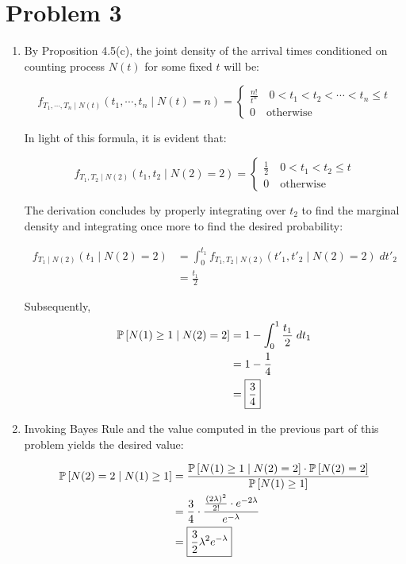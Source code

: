 \documentclass[12pt]{article}%
\begin{document}
\section{Problem 3}
\begin{enumerate}
  \item By Proposition 4.5(c), the joint density of the arrival times conditioned on counting process $N(t)$ for some fixed $t$ will be:

\[ f_{T_1,\cdots,T_n\mid N(t)}(t_1,\cdots,t_n\mid N(t) = n) = \begin{cases}
    \frac{n!}{t^{n}} \quad 0 < t_1 < t_2 < \cdots < t_n \leq t \\
    0 \quad \text{otherwise}
\end{cases} \]

  In light of this formula, it is evident that:

  \[ f_{T_1,T_2\mid N(2)}(t_1,t_2 \mid N(2) = 2) = \begin{cases}
      \frac{1}{2} \quad 0 < t_1 < t_2  \leq t \\
      0 \quad \text{otherwise}
  \end{cases} \]

  The derivation concludes by properly integrating over $t_2$ to find the marginal density and integrating once more to find the desired probability:

  \begin{align*}
     f_{T_1\mid N(2)}(t_1\mid N(2)=2) & = \int_0^{t_1} f_{T_1,T_2\mid N(2)}(t'_1,t'_2 \mid N(2) = 2) \; dt'_2 \\
    & = \frac{t_1}{2}
    \end{align*}

  Subsequently,
  \begin{align*}
    \mathbb{P}\left[N(1) \geq 1 \mid N(2) = 2\right] &  = 1 - \int_{0}^1 \frac{t_1}{2}\; dt_1 \\
    & = 1 - \frac{1}{4} \\
    & = \boxed{\frac{3}{4}}
  \end{align*}

  \item
  Invoking Bayes Rule and the value computed in the previous part of this problem yields the desired value:

  \begin{align*}
    \mathbb{P}\left[N(2) = 2  \mid N(1) \geq 1\right] & = \frac{\mathbb{P}\left[N(1) \geq 1 \mid N(2) = 2\right]\cdot\mathbb{P}\left[N(2)=2\right]}{\mathbb{P}\left[N(1) \geq 1\right]} \\
    & = \frac{3}{4}\cdot \frac{\frac{(2\lambda)^2}{2!}\cdot e^{-2\lambda}}{e^{-\lambda}} \\
    & = \boxed{\frac{3}{2}\lambda^2e^{-\lambda}}
  \end{align*}

\end{enumerate}
\end{document}
